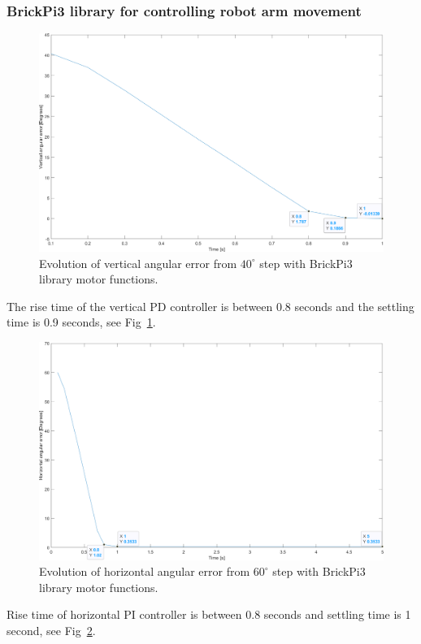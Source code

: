 \subsubsection{BrickPi3 library for controlling robot arm movement}
\label{sec:simon16}
\begin{figure}[h]
\centering
\includegraphics[width=\linewidth]{sections/assets/Vertical_built_in_functions.png}
\caption{Evolution of vertical angular error from \(40^{\circ}\) step with BrickPi3 library motor functions.}
\label{vert_bp3}
\end{figure}
The rise time of the vertical PD controller is between 0.8 seconds and the settling time is 0.9 seconds, see Fig~\ref{vert_bp3}.
\begin{figure}[h]
\centering
\includegraphics[width=\linewidth]{sections/assets/Horizontal_built_in_funtion.png}
\caption{Evolution of horizontal angular error from \(60^{\circ}\) step with BrickPi3 library motor functions.}
\label{Horizontal_bp3}
\end{figure}
Rise time of horizontal PI controller is between 0.8 seconds and settling time is 1 second, see Fig~\ref{Horizontal_bp3}.

